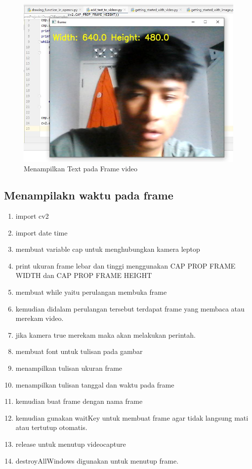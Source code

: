 \begin{figure}[ht]
\centering
\includegraphics[scale=0.5]{figures/2,17.jpg}
\caption{Menampilkan Text pada Frame video}
\label{contoh}
\end{figure}



\newpage
\subsection{Menampilakn waktu pada frame}

\begin{enumerate}
	\item import cv2
	\item import date time
	\item membuat variable cap untuk menghubungkan kamera leptop
	\item print ukuran frame lebar dan tinggi menggunakan CAP PROP FRAME WIDTH dan CAP PROP FRAME HEIGHT
	\item membuat while yaitu perulangan membuka frame
	\item kemudian didalam perulangan tersebut terdapat frame yang membaca atau merekam video.
	\item jika kamera true merekam maka akan melakukan perintah. 
	\item membuat font untuk tulisan pada gambar
	\item menampilkan tulisan ukuran frame
	\item menampilkan tulisan tanggal dan waktu pada frame
	\item kemudian buat frame dengan nama frame
	\item kemudian gunakan waitKey untuk membuat frame agar tidak langsung mati atau tertutup otomatis.
	\item release untuk menutup videocapture
	\item destroyAllWindows digunakan untuk menutup frame.
\end{enumerate}

